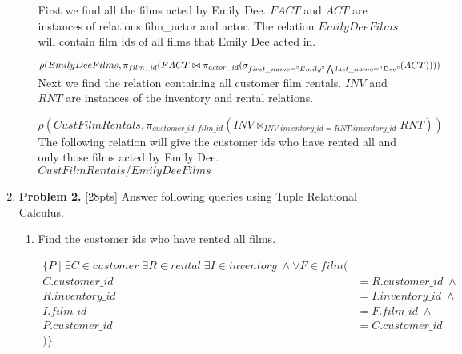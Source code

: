 \documentclass[paper=a4, fontsize=11pt]{scrartcl} %
\numberwithin{figure}{section} %
\numberwithin{table}{section} %
\begin{document}
\begin{enumerate}
\begin{enumerate}
First we find all the films acted by Emily Dee. $FACT$ and $ACT$ are instances of relations film_actor and actor. The relation $EmilyDeeFilms$ will contain film ids of all films that Emily Dee acted in.

$\rho(EmilyDeeFilms, \pi_{film\_id}(FACT \bowtie \pi_{actor\_id}(\sigma_{first\_name = "Emily" \bigwedge last\_name = "Dee"} (ACT))))$\\

Next we find the relation containing all customer film rentals. $INV$ and $RNT$ are instances of the inventory and rental relations.

$\rho(CustFilmRentals, \pi_{customer\_id, film\_id} (INV \bowtie_{INV.inventory\_id = RNT.inventory\_id} RNT))$\\

The following relation will give the customer ids who have rented all and only those films acted by Emily Dee.\\

$CustFilmRentals / EmilyDeeFilms$
\end{enumerate}

\item \textbf{Problem 2.} [28pts] Answer following queries using Tuple Relational Calculus.

\begin{enumerate}

\item Find the customer ids who have rented all films.

\begin{equation*}
\begin{aligned}
 \{ P \; | \; \exists C \in customer \; \exists R \in rental \; \exists I \in inventory \; \wedge \forall F \in film (\\
 C.customer\_id &= R.customer\_id \; \wedge \\
 R.inventory\_id &= I.inventory\_id \; \wedge \\
 I.film\_id &= F.film\_id \; \wedge  \\
 P.customer\_id &= C.customer\_id\\
 )  \}
\end{aligned}
\end{equation*}


\end{enumerate}
\end{enumerate}
\end{document}
